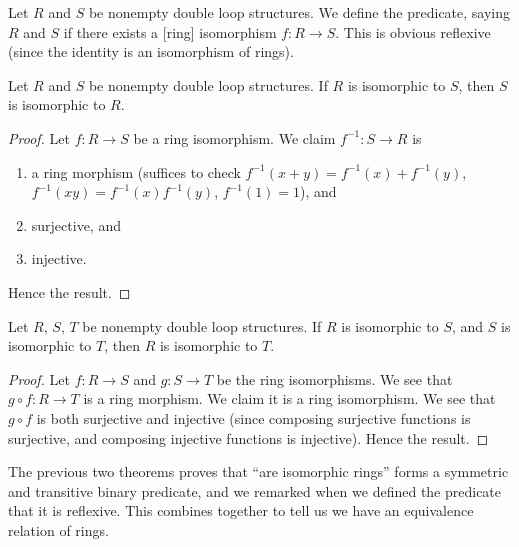 \begin{definition}
Let $R$ and $S$ be nonempty double loop structures.
We define the predicate, saying $R$ and $S$ 
if there exists a [ring] isomorphism $f\colon R\to S$.
This is obvious reflexive (since the identity is an isomorphism of rings).
\end{definition}

\begin{theorem}
Let $R$ and $S$ be nonempty double loop structures.
If $R$ is isomorphic to $S$, then $S$ is isomorphic to $R$.
\end{theorem}

\begin{proof}
Let $f\colon R\to S$ be a ring isomorphism. We claim $f^{-1}\colon S\to R$
is
\begin{enumerate}
\item a ring morphism (suffices to check
  $f^{-1}(x+y)=f^{-1}(x)+f^{-1}(y)$, $f^{-1}(xy)=f^{-1}(x)f^{-1}(y)$, $f^{-1}(1)=1$), and
\item surjective, and
\item injective.
\end{enumerate}
Hence the result.
\end{proof}

\begin{theorem}
Let $R$, $S$, $T$ be nonempty double loop structures.
If $R$ is isomorphic to $S$, and $S$ is isomorphic to $T$,
then $R$ is isomorphic to $T$.
\end{theorem}

\begin{proof}
Let $f\colon R\to S$ and $g\colon S\to T$ be the ring isomorphisms.
We see that $g\circ f\colon R\to T$ is a ring morphism. We claim it is
a ring isomorphism. We see that $g\circ f$ is both surjective and
injective (since composing surjective functions is surjective, and
composing injective functions is injective). Hence the result.
\end{proof}

\begin{remark}
The previous two theorems proves that ``are isomorphic rings'' forms a
symmetric and transitive binary predicate, and we remarked when we
defined the predicate that it is reflexive. This combines together to
tell us we have an equivalence relation of rings.
\end{remark}


